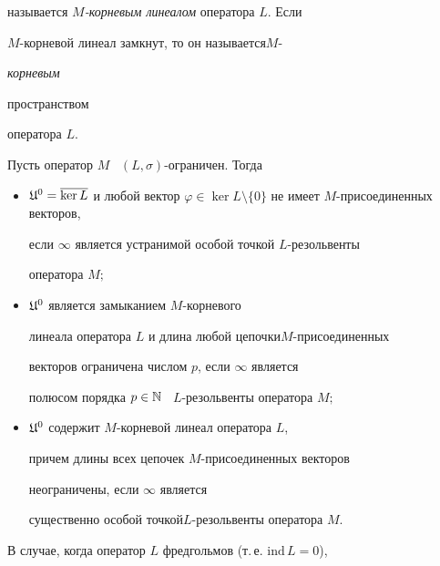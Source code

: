называется {\it $M$-корневым линеалом} оператора $L$. Если 


$M$-корневой линеал замкнут, то он называется\linebreak $M$-{\it корневым


пространством} оператора $L$.








\begin{thms}


Пусть оператор $M$ \ $(L,\sigma)$-ограничен. Тогда 


\begin{itemize}


\item[(i)] $\frak U^{0}=\overline{\ker L}$ и любой вектор $\varphi\in\ker


L\setminus\{0\}$ не имеет $M$-присоединенных векторов,


если $\infty$ является устранимой особой точкой $L$-резольвенты


оператора $M;$


\item[(ii)] 


$\frak U^{0}$ является замыканием $M$-корневого


линеала оператора $L$ и длина любой цепочки\linebreak $M$-присоединенных


векторов ограничена числом $p$, если $\infty$ является


полюсом порядка $p\in\Bbb N$ \ $L$-резольвенты оператора $M;$


\item[(iii)] 


$\frak U^{0}$ содержит $M$-корневой линеал оператора $L$,


причем длины всех цепочек $M$-при\-со\-е\-ди\-нен\-ных векторов


неограничены, если $\infty$ является


существенно особой точкой\linebreak $L$-резольвенты  оператора $M$.


\end{itemize}


\end{thms}





В случае, когда оператор $L$ фредгольмов (т.\,е. $\mathrm{ind}\, L=0$),


